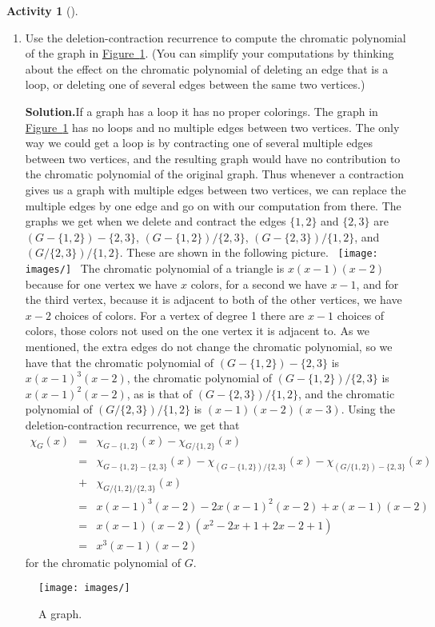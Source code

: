 \documentclass[10pt,]{book}
\theoremstyle{plain}
\theoremstyle{definition}
\newtheorem{activity}[project]{Activity}
\numberwithin{equation}{chapter}
\newcommand{\amp}{&}
\begin{document}
\begin{activity}[]
\begin{enumerate}[label=(\alph*)]
~\par
\item Use the deletion-contraction recurrence to compute the chromatic polynomial of the graph in \hyperref[del-cont]{Figure~\ref{del-cont}}. (You can simplify your computations by thinking about the effect on the chromatic polynomial of deleting an edge that is a loop, or deleting one of several edges between the same two vertices.)%
\par\medskip\noindent%
\textbf{Solution.}\quad If a graph has a loop it has no proper colorings. The graph in \hyperref[del-cont]{Figure~\ref{del-cont}} has no loops and no multiple edges between two vertices. The only way we could get a loop is by contracting one of several multiple edges between two vertices, and the resulting graph would have no contribution to the chromatic polynomial of the original graph. Thus whenever a contraction gives us a graph with multiple edges between two vertices, we can replace the multiple edges by one edge and go on with our computation from there. The graphs we get when we delete and contract the edges \(\{1,2\}\) and \(\{2,3\}\) are \((G-\{1,2\})-\{2,3\}\), \((G-\{1,2\})/\{2,3\}\), \((G-\{2,3\})/\{1,2\}\), and \((G/\{2,3\})/\{1,2\}\). These are shown in the following picture. \mbox{ \texttt{[image: images/]}
 } The chromatic polynomial of a triangle is \(x(x-1)(x-2)\) because for one vertex we have \(x\) colors, for a second we have \(x-1\), and for the third vertex, because it is adjacent to both of the other vertices, we have \(x-2\) choices of colors. For a vertex of degree 1 there are \(x-1\) choices of colors, those colors not used on the one vertex it is adjacent to. As we mentioned, the extra edges do not change the chromatic polynomial, so we have that the chromatic polynomial of \((G-\{1,2\})-\{2,3\}\) is \(x(x-1)^3(x-2)\), the chromatic polynomial of \((G-\{1,2\})/\{2,3\}\) is \(x(x-1)^2(x-2)\), as is that of \((G-\{2,3\})/\{1,2\}\), and the chromatic polynomial of \((G/\{2,3\})/\{1,2\}\) is \((x-1)(x-2)(x-3)\). Using the deletion-contraction recurrence, we get that%
\begin{align*}
\chi_G(x) \amp =\amp  \chi_{G-\{1,2\}}(x) - \chi_{G/\{1,2\}}(x)\\
\amp =\amp
\chi_{G-\{1,2\}-\{2,3\}}(x)-\chi_{(G-\{1,2\})/\{2,3\}}(x)-
\chi_{(G/\{1,2\})-\{2,3\}}(x)\\
\amp +\amp  \chi_{G/\{1,2\}/\{2,3\}}(x)\\
\amp =\amp  x(x-1)^3(x-2)-2x(x-1)^2(x-2) + x(x-1)(x-2)\\
\amp =\amp  x(x-1)(x-2)(x^2-2x+1 +2x-2 +1)\\
\amp =\amp  x^3(x-1)(x-2)
\end{align*}
for the chromatic polynomial of \(G\).%

\end{enumerate}
\begin{figure}
\centering
\texttt{[image: images/]}
\caption{A graph.\label{del-cont}}
\end{figure}
\end{activity}
\end{document}
